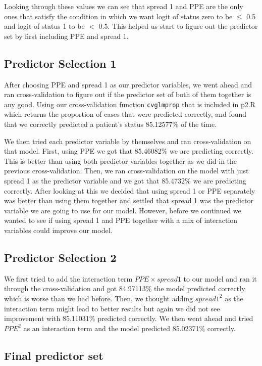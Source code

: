 \documentclass{article}
\begin{document}
Looking through these values we can see that spread 1 and PPE are the only
ones that satisfy the condition in which we want logit of status zero to
be $\leq$ 0.5 and logit of status 1 to be $<$ 0.5. This helped us start to
figure out the predictor set by first including PPE and spread 1.

\subsection{Predictor Selection 1}

After choosing PPE and spread 1 as our predictor variables, we went ahead and
ran cross-validation to figure out if the predictor set of both of them
together is any good. Using our cross-validation function \verb+cvglmprop+
that is included in p2.R which returns the proportion of cases that were
predicted correctly, and found that we correctly predicted a patient's
status 85.12577\% of the time.

We then tried each predictor variable by themselves and ran cross-validation
on that model. First, using PPE we got that 85.46082\% we are predicting
correctly. This is better than using both predictor variables together as
we did in the previous cross-validation. Then, we ran cross-validation on
the model with just spread 1 as the predictor variable and we got that 85.4732\%
we are predicting correctly. After looking at this we decided that using
spread 1 or PPE separately was better than using them together and settled
that spread 1 was the predictor variable we are going to use for our model.
However, before we continued we wanted to see if using spread 1 and PPE together
with a mix of interaction variables could improve our model.

\subsection{Predictor Selection 2}

We first tried to add the interaction term $PPE \times spread 1$ to our model
and ran it through the cross-validation and got 84.97113\% the model predicted
correctly which is worse than we had before. Then, we thought adding $spread1^{2}$
as the interaction term might lead to better results but again we did not see
improvement with 85.11031\% predicted correctly. We then went ahead and
tried $PPE^{2}$ as an interaction term and the model predicted 85.02371\% correctly.

\subsection{Final predictor set}
\end{document}
